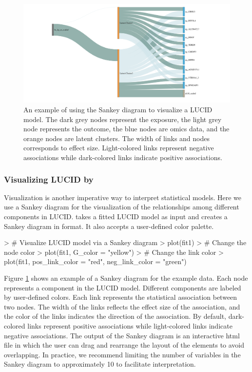 
\begin{figure}[]
    \centering
    \includegraphics[width = \textwidth]{figures/fig3.pdf}
    \caption{An example of using the Sankey diagram to visualize a LUCID model. The dark grey nodes represent the exposure, the light grey node represents the outcome, the blue nodes are omics data, and the orange nodes are latent clusters. The width of links and nodes corresponds to effect size. Light-colored links represent negative associations while dark-colored links indicate positive associations.}
    \label{fig3}
\end{figure}

\subsubsection{Visualizing LUCID by } \label{sec3.2.2}

Visualization is another imperative way to interpret statistical models. Here we use a Sankey diagram \citep{schmidt2008sankey} for the visualization of the relationships among different components in LUCID.  takes a fitted LUCID model as input and creates a Sankey diagram in  format. It also accepts a user-defined color palette. 

\begin{example}
> # Visualize LUCID model via a Sankey diagram
> plot(fit1)
> # Change the node color
> plot(fit1, G_color = "yellow")
> # Change the link color
> plot(fit1, pos_link_color = "red", neg_link_color = "green")
\end{example}

Figure \ref{fig3} shows an example of a Sankey diagram for the example data. Each node represents a component in the LUCID model. Different components are labeled by user-defined colors. Each link represents the statistical association between two nodes. The width of the links reflects the effect size of the association, and the color of the links indicates the direction of the association. By default, dark-colored links represent positive associations while light-colored links indicate negative associations. The output of the Sankey diagram is an interactive html file in which the user can drag and rearrange the layout of the elements to avoid overlapping. In practice, we recommend limiting the number of variables in the Sankey diagram to approximately 10 to facilitate interpretation.


